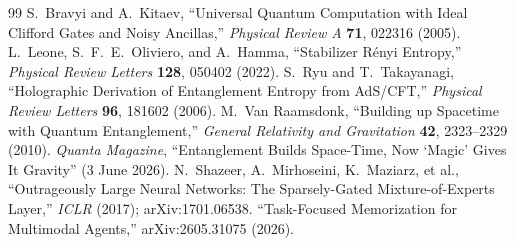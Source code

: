 \documentclass[11pt]{article}
\begin{document}
\begin{thebibliography}{99}
 S.~Bravyi and A.~Kitaev, ``Universal Quantum Computation with Ideal Clifford Gates and Noisy Ancillas,'' \emph{Physical Review A} \textbf{71}, 022316 (2005).
 L.~Leone, S.~F.~E.~Oliviero, and A.~Hamma, ``Stabilizer R\'enyi Entropy,'' \emph{Physical Review Letters} \textbf{128}, 050402 (2022).
 S.~Ryu and T.~Takayanagi, ``Holographic Derivation of Entanglement Entropy from AdS/CFT,'' \emph{Physical Review Letters} \textbf{96}, 181602 (2006).
 M.~Van Raamsdonk, ``Building up Spacetime with Quantum Entanglement,'' \emph{General Relativity and Gravitation} \textbf{42}, 2323--2329 (2010).
 \emph{Quanta Magazine}, ``Entanglement Builds Space-Time, Now `Magic' Gives It Gravity'' (3 June 2026).
 N.~Shazeer, A.~Mirhoseini, K.~Maziarz, et al., ``Outrageously Large Neural Networks: The Sparsely-Gated Mixture-of-Experts Layer,'' \emph{ICLR} (2017); arXiv:1701.06538.
 ``Task-Focused Memorization for Multimodal Agents,'' arXiv:2605.31075 (2026).
\end{thebibliography}
\end{document}
